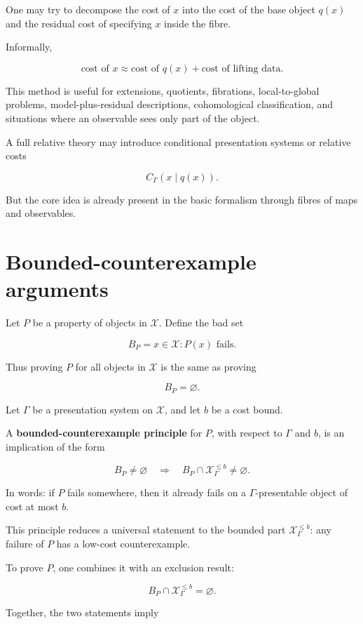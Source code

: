 \documentclass[11pt]{article}
\begin{document}
One may try to decompose the cost of \(x\) into the cost of the base object \(q(x)\) and the residual cost of specifying \(x\) inside the fibre.

Informally,

\[
\text{cost of }x
\approx
\text{cost of }q(x)
+
\text{cost of lifting data}.
\]

This method is useful for extensions, quotients, fibrations, local-to-global problems, model-plus-residual descriptions, cohomological classification, and situations where an observable sees only part of the object.

A full relative theory may introduce conditional presentation systems or relative costs

\[
C_\Gamma(x\mid q(x)).
\]

But the core idea is already present in the basic formalism through fibres of maps and observables.


\section{Bounded-counterexample arguments}

Let \(P\) be a property of objects in \(\mathcal X\). Define the bad set

\[
B_P={x\in\mathcal X : P(x)\text{ fails}}.
\]

Thus proving \(P\) for all objects in \(\mathcal X\) is the same as proving

\[
B_P=\varnothing.
\]

Let \(\Gamma\) be a presentation system on \(\mathcal X\), and let \(b\) be a cost bound.

A \textbf{bounded-counterexample principle} for \(P\), with respect to \(\Gamma\) and \(b\), is an implication of the form

\[
B_P\neq\varnothing
\quad\Longrightarrow\quad
B_P\cap \mathcal X_\Gamma^{\leq b}\neq\varnothing.
\]

In words: if \(P\) fails somewhere, then it already fails on a \(\Gamma\)-presentable object of cost at most \(b\).

This principle reduces a universal statement to the bounded part \(\mathcal X_\Gamma^{\leq b}\): any failure of \(P\) has a low-cost counterexample.

To prove \(P\), one combines it with an exclusion result:

\[
B_P\cap \mathcal X_\Gamma^{\leq b}=\varnothing.
\]

Together, the two statements imply
\end{document}
